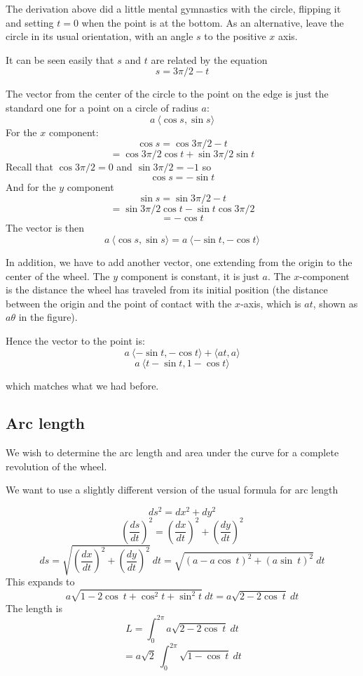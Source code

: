 \documentclass[11pt, oneside]{report}   	%
\begin{document}
The derivation above did a little mental gymnastics with the circle, flipping it and setting $t=0$ when the point is at the bottom.  As an alternative, leave the circle in its usual orientation, with an angle $s$ to the positive $x$ axis.

It can be seen easily that $s$ and $t$ are related by the equation 
\[ s = 3\pi/2 - t \]

The vector from the center of the circle to the point on the edge is just the standard one for a point on a circle of radius $a$:
\[ a \ \langle \cos s, \sin s  \rangle \]
For the $x$ component:
\[ \cos s = \cos 3 \pi / 2 - t \]
\[ = \cos 3 \pi / 2  \cos t + \sin 3 \pi / 2 \sin t \]
Recall that $\cos 3 \pi / 2 = 0$ and $\sin 3 \pi / 2 = -1$ so
\[ \cos s = - \sin t \]
And for the $y$ component
\[ \sin s = \sin 3 \pi / 2 - t \]
\[ = \sin 3 \pi / 2 \cos t - \sin t \cos  3 \pi / 2 \]
\[ = - \cos t \]
The vector is then
\[ a \ \langle \cos s, \sin s  \rangle = a \ \langle -\sin t, -\cos t  \rangle \]

In addition, we have to add another vector, one extending from the origin to the center of the wheel.  The $y$ component is constant, it is just $a$.  The $x$-component is the distance the wheel has traveled from its initial position (the distance between the origin and the point of contact with the $x$-axis, which is $at$, shown as $a \theta$ in the figure).

Hence the vector to the point is:
\[ a \ \langle -\sin t, -\cos t  \rangle + \langle at, a \rangle \]
\[ a \ \langle t - \sin t, 1 - \cos t \rangle \]

which matches what we had before.

\subsection*{Arc length}

We wish to determine the arc length and area under the curve for a complete revolution of the wheel.

We want to use a slightly different version of the usual formula for arc length

\[ ds^2 = dx^2 + dy^2 \]
\[ (\frac{ds}{dt})^2 = (\frac{dx}{dt})^2 + (\frac{dy}{dt})^2 \]
\[ ds = \sqrt{(\frac{dx}{dt})^2 + (\frac{dy}{dt})^2} \ dt = \sqrt{(a - a \cos\ t)^2 + (a \sin\ t)^2} \ dt  \]
This expands to
\[ a \sqrt{1 - 2 \cos\ t + \cos^2t + \sin^2t } \ dt =  a \sqrt{2 - 2 \cos \ t} \ dt\] 
The length is
\[ L = \int_0^{2\pi} a \sqrt{2 - 2 \cos \ t} \ dt\]
\[ = a \sqrt{2} \ \int_0^{2\pi} \sqrt{1 - \cos \ t} \ dt\]
\end{document}
